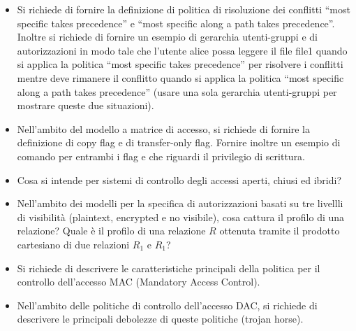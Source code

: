 \documentclass{report}
\begin{document}
\begin{itemize}
    \item Si richiede di fornire la definizione di politica di risoluzione dei conflitti “most specific takes precedence” e “most
specific along a path takes precedence”. Inoltre si richiede di fornire un esempio di gerarchia utenti-gruppi e
di autorizzazioni in modo tale che l'utente alice possa leggere il file file1 quando si applica la politica “most
specific takes precedence” per risolvere i conflitti mentre deve rimanere il conflitto quando si applica la politica
“most specific along a path takes precedence” (usare una sola gerarchia utenti-gruppi per mostrare
queste due situazioni).
    \item Nell'ambito del modello a matrice di accesso, si richiede di fornire la definizione di copy flag e di transfer-only
flag. Fornire inoltre un esempio di comando per entrambi i flag e che riguardi il privilegio di scrittura.
    \item Cosa si intende per sistemi di controllo degli accessi aperti, chiusi ed ibridi?
    \item Nell'ambito dei modelli per la specifica di autorizzazioni basati su tre livellli di visibilità (plaintext, encrypted
e no visibile), cosa cattura il profilo di una relazione? Quale è il profilo di una relazione $R$ ottenuta tramite il prodotto cartesiano di due relazioni $R_1$ e $R_1$?
    \item Si richiede di descrivere le caratteristiche principali della politica per il controllo dell'accesso MAC (Mandatory Access Control).
    \item Nell'ambito delle politiche di controllo dell'accesso DAC, si richiede di descrivere le principali debolezze di queste politiche (trojan horse).
\end{itemize}
\end{document}
